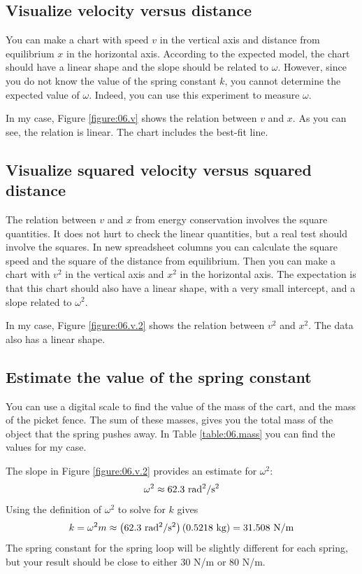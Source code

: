\subsection{Visualize velocity versus distance}
%
You can make a chart with speed $v$ in the vertical axis and distance from equilibrium $x$ in the horizontal axis. According to the expected model, the chart should have a linear shape and the slope should be related to $\omega$. However, since you do not know the value of the spring constant $k$, you cannot determine the expected value of $\omega$. Indeed, you can use this experiment to measure $\omega$.

In my case, Figure \ref{figure:06.v} shows the relation between $v$ and $x$. As you can see, the relation is linear. The chart includes the best-fit line.
%
\subsection{Visualize squared velocity versus squared distance}
%
The relation between $v$ and $x$ from energy conservation involves the square quantities. It does not hurt to check the linear quantities, but a real test should involve the squares. In new spreadsheet columns you can calculate the square speed and the square of the distance from equilibrium. Then you can make a chart with $v^{2}$ in the vertical axis and $x^{2}$ in the horizontal axis. The expectation is that this chart should also have a linear shape, with a very small intercept, and a slope related to $\omega^{2}$.

In my case, Figure \ref{figure:06.v.2} shows the relation between $v^{2}$ and $x^{2}$. The data also has a linear shape.
%
\subsection{Estimate the value of the spring constant}
%
You can use a digital scale to find the value of the mass of the cart, and the mass of the picket fence. The sum of these masses, gives you the total mass of the object that the spring pushes away. In Table \ref{table:06.mass} you can find the values for my case.

The slope in Figure \ref{figure:06.v.2} provides an estimate for $\omega^{2}$:
\begin{equation}
    \omega^{2} \approx 62.3 \ \text{rad\textsuperscript{2}/s\textsuperscript{2}}
\end{equation}
Using the definition of $\omega^{2}$ to solve for $k$ gives
\begin{equation}
    k = \omega^{2} m \approx \left( 62.3 \ \text{rad\textsuperscript{2}/s\textsuperscript{2}} \right) \left( 0.5218 \ \text{kg} \right) = 31.508 \ \text{N/m}
\end{equation}
The spring constant for the spring loop will be slightly different for each spring, but your result should be close to either 30 N/m or 80 N/m.
%
